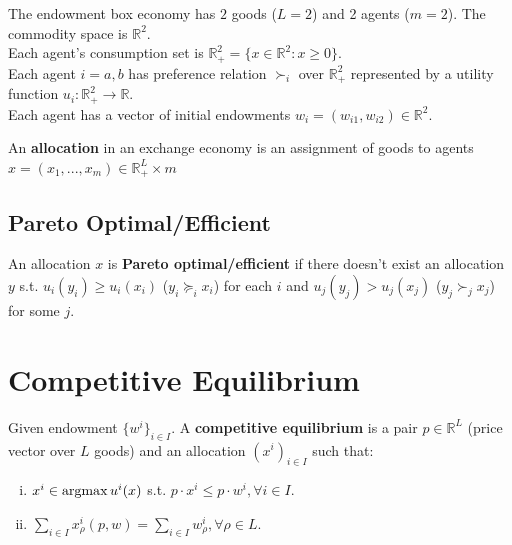 \documentclass[11pt]{elegantbook}
\newcommand{\argmax}{\operatornamewithlimits{argmax}}
\begin{document}
\begin{example}
    The endowment box economy has $2$ goods ($L=2$) and 2 agents ($m=2$). The commodity space is $\mathbb{R}^2$.\\
    Each agent's consumption set is $\mathbb{R}_+^2=\{x\in \mathbb{R}^2:x\geq 0\}$.\\
    Each agent $i=a,b$ has preference relation $\succ_i$ over $\mathbb{R}_+^2$ represented by a utility function $u_i: \mathbb{R}_+^2 \rightarrow \mathbb{R}$.\\
    Each agent has a vector of initial endowments $w_i=(w_{i1},w_{i2})\in \mathbb{R}^2$.
\end{example}

\begin{definition}[Allocation]
    \normalfont
    An \textbf{allocation} in an exchange economy is an assignment of goods to agents $x=(x_1,...,x_m)\in \mathbb{R}_+^L\times m$
\end{definition}

\subsection{Pareto Optimal/Efficient}
\begin{definition}
    \normalfont
    An allocation $x$ is \textbf{Pareto optimal/efficient} if there doesn't exist an allocation $y$ s.t. $u_i(y_i)\geq u_i(x_i)$ ($y_i\succeq_i x_i$) for each $i$ and $u_j(y_j)> u_j(x_j)$ ($y_j\succ_j x_j$) for some $j$.
\end{definition}


















\section{Competitive Equilibrium}
\begin{definition}
    \normalfont
    Given endowment $\{w^i\}_{i\in I}$. A \textbf{competitive equilibrium} is a pair $p\in \mathbb{R}^L$ (price vector over $L$ goods) and an allocation $(x^i)_{i\in I}$ such that:
    \begin{enumerate}[(i).]
        \item $x^i\in \argmax u^i(x)$ s.t. $p\cdot x^i\leq p\cdot w^i, \forall i\in I$.
        \item $\sum_{i\in I}x^i_\rho (p,w)=\sum_{i\in I}w^i_\rho, \forall \rho\in L$.
    \end{enumerate}
\end{definition}
\end{document}
